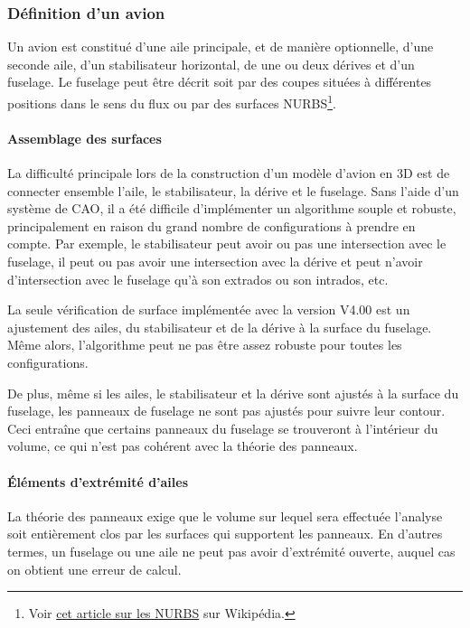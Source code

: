 \documentclass[a4paper,twoside,12pt,dvips]{article}
\begin{document}
\subsubsection{Définition d’un avion}

Un avion est constitué d’une aile principale, et de manière optionnelle, d’une
seconde aile, d’un stabilisateur horizontal, de une ou deux dérives et d’un fuselage. Le fuselage peut être décrit soit par des coupes situées à différentes positions dans le sens du flux ou par des surfaces NURBS\footnote{Voir \href{https://fr.wikipedia.org/wiki/NURBS}{cet article sur les NURBS} sur Wikipédia.}.

\paragraph{Assemblage des surfaces}

La difficulté principale lors de la construction d’un modèle d’avion en 3D est de connecter ensemble l’aile, le stabilisateur, la dérive et le fuselage. Sans l’aide d’un système de CAO, il a été difficile d’implémenter un algorithme souple et robuste, principalement en raison du grand nombre de configurations à prendre en compte. Par exemple, le stabilisateur peut avoir ou pas une intersection avec le fuselage, il peut ou pas avoir une intersection avec la dérive et peut n’avoir d’intersection avec le fuselage qu’à son extrados ou son intrados, etc.

La seule vérification de surface implémentée avec la version V4.00 est un ajustement des ailes, du stabilisateur et de la dérive à la surface du fuselage. Même alors, l’algorithme peut ne pas être assez robuste pour toutes les configurations.

De plus, même si les ailes, le stabilisateur et la dérive sont ajustés à la surface du fuselage, les panneaux de fuselage ne sont pas ajustés pour suivre leur contour. Ceci entraîne que certains panneaux du fuselage se trouveront à l’intérieur du volume, ce qui n’est pas cohérent avec la théorie des panneaux.

\paragraph{Éléments d’extrémité d’ailes}

La théorie des panneaux exige que le volume sur lequel sera effectuée l’analyse soit entièrement clos par les surfaces qui supportent les panneaux. En d’autres termes, un fuselage ou une aile ne peut pas avoir d’extrémité ouverte, auquel cas on obtient une erreur de calcul.
\end{document}
